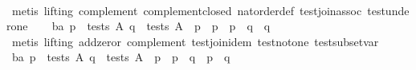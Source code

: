 \begin{isabellebody}
%
\isadelimproof
\ \ \ \ %
\endisadelimproof
%
\isatagproof
{}\isamarkupfalse%
\ {}metis\ {}lifting{}\ complement{}\ complement{}closed\ nat{}order{}def\ test{}join{}assoc\ test{}under{}one{}%
\endisatagproof
{\isafoldproof}%
%
\isadelimproof
\isanewline
%
\endisadelimproof
\isanewline
\ \ \isamarkupfalse%
\ ba{}{}{}\ {}{}p\ {}\ tests\ A{}\ q\ {}\ tests\ A{}\ {}\ p\ {}\ p\ {}\ p\ {}\ {}{}q\ {}\ {}q{}{}\isanewline
%
\isadelimproof
\ \ \ \ %
\endisadelimproof
%
\isatagproof
{}\isamarkupfalse%
\ {}metis\ {}lifting{}\ add{}zeror\ complement{}\ test{}join{}idem\ test{}not{}one\ test{}subset{}var{}%
\endisatagproof
{\isafoldproof}%
%
\isadelimproof
\isanewline
%
\endisadelimproof
\isanewline
\ \ \isamarkupfalse%
\ ba{}{}{}\ {}{}p\ {}\ tests\ A{}\ q\ {}\ tests\ A{}\ {}\ p\ {}\ {}p\ {}\ {}q{}\ {}\ {}p\ {}\ q{}{}\isanewline

\end{isabellebody}
